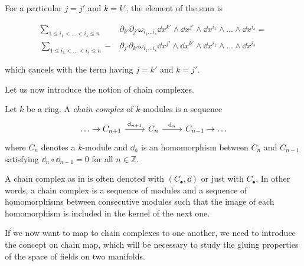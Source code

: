 For a particular $j=j'$ and $k=k'$, the element of the sum is

\begin{align*}
     \sum_{1 \leq i_1 < \ldots < i_s \leq n}
     &\partial_{k'} \partial_{j'} \omega_{i_1 \ldots i_s}
     \dd x^{k'} \wedge \dd x^{j'} \wedge \dd x^{i_1} \wedge \ldots \wedge \dd x^{i_s} = \\
     \sum_{1 \leq i_1 < \ldots < i_s \leq n}
     - &\partial_{j'} \partial_{k'} \omega_{i_1 \ldots i_s}
     \dd x^{j'} \wedge \dd x^{k'} \wedge \dd x^{i_1} \wedge \ldots \wedge \dd x^{i_s}
\end{align*}

which cancels with the term having $j = k'$ and $k=j'$.

Let us now introduce the notion of chain complexes.

\begin{definition}
\label{def:chain}
    Let $k$ be a ring. A \emph{chain complex} of $k$-modules is a sequence
    \begin{equation*}
        \begin{tikzcd}
            \ldots \rightarrow  C_{n+1} \arrow[r, "\dd _{n+1}"] & C_n
            \arrow[r, "\dd _{n}"] & C_{n-1} \rightarrow \ldots
        \end{tikzcd}
    \end{equation*}
    where $C_n$ denotes a $k$-module and $\dd _n$ is an homomorphism between $C_n$ and $C_{n-1}$ satisfying $\dd _n \circ \dd _{n-1} = 0$ for all $n \in \mathbb{Z}$.
\end{definition}

A chain complex as in  is often denoted with $(C_{\bullet}, \dd)$ or just with $C_{\bullet}$.
In other words, a chain complex is a sequence of modules and a sequence of homomorphisms between consecutive modules such that the image of each homomorphism is included in the kernel of the next one.

If we now want to map to chain complexes to one another, we need to introduce the concept on chain map, which will be necessary to study the gluing properties of the space of fields on two manifolds.

